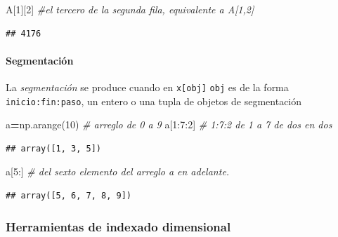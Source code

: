 \documentclass[
]{book}
\newenvironment{Shaded}{\begin{snugshade}}{\end{snugshade}}
\newcommand{\CommentTok}[1]{\textcolor[rgb]{0.56,0.35,0.01}{\textit{#1}}}
\newcommand{\DecValTok}[1]{\textcolor[rgb]{0.00,0.00,0.81}{#1}}
\newcommand{\NormalTok}[1]{#1}
\newcommand{\OperatorTok}[1]{\textcolor[rgb]{0.81,0.36,0.00}{\textbf{#1}}}
\theoremstyle{definition}
\theoremstyle{definition}
\theoremstyle{definition}
\theoremstyle{definition}
\theoremstyle{remark}
\begin{document}
\begin{Shaded}
\begin{Highlighting}[]
\NormalTok{A[}\DecValTok{1}\NormalTok{][}\DecValTok{2}\NormalTok{] }\CommentTok{\#el tercero de la segunda fila, equivalente a A[1,2] }
\end{Highlighting}
\end{Shaded}

\begin{verbatim}
## 4176
\end{verbatim}

\hypertarget{segmentaciuxf3n}{%
\paragraph{Segmentación}\label{segmentaciuxf3n}}

La \emph{segmentación} se produce cuando en \texttt{x{[}obj{]}} \texttt{obj} es de la forma \texttt{inicio:fin:paso}, un entero o una tupla de objetos de segmentación

\begin{Shaded}
\begin{Highlighting}[]
\NormalTok{a}\OperatorTok{=}\NormalTok{np.arange(}\DecValTok{10}\NormalTok{) }\CommentTok{\# arreglo de 0 a  9}
\NormalTok{a[}\DecValTok{1}\NormalTok{:}\DecValTok{7}\NormalTok{:}\DecValTok{2}\NormalTok{] }\CommentTok{\# 1:7:2 de 1 a 7 de dos en dos  }
\end{Highlighting}
\end{Shaded}

\begin{verbatim}
## array([1, 3, 5])
\end{verbatim}

\begin{Shaded}
\begin{Highlighting}[]
\NormalTok{a[}\DecValTok{5}\NormalTok{:]    }\CommentTok{\# del sexto elemento del arreglo a en adelante.    }
\end{Highlighting}
\end{Shaded}

\begin{verbatim}
## array([5, 6, 7, 8, 9])
\end{verbatim}

\hypertarget{herramientas-de-indexado-dimensional}{%
\subsubsection{Herramientas de indexado dimensional}\label{herramientas-de-indexado-dimensional}}
\end{document}
